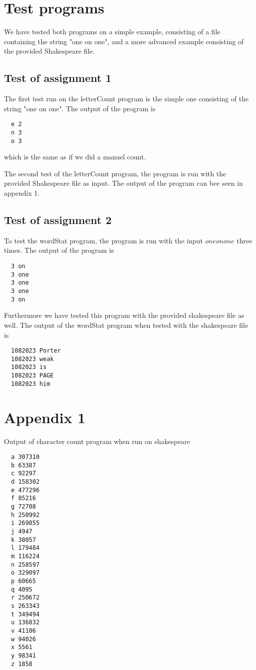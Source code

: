 \documentclass[10pt, a4paper]{article}
\begin{document}
               


\section{Test programs}
We have tested both programs on a simple example, consisting of a file containing the string "one on one", and a more advanced example consisting of the provided Shakespeare file.

\subsection{Test of assignment 1} %
\label{sub:assignment_1}
The first test run on the letterCount program is the simple one consisting of the string "one on one". The output of the program is
\begin{verbatim}
  e	2
  n	3
  o	3
\end{verbatim}
which is the same as if we did a manuel count.

The second test of the letterCount program, the program is run with the provided Shakespeare file as input. The output of the program can bee seen in appendix 1.

\subsection{Test of assignment 2} %
\label{sub:assignment_2}

To test the wordStat program, the program is run with the input $one on one$ three times. The output of the program is

\begin{verbatim}  
  3 on
  3 one
  3 one
  3 one    
  3 on  
\end{verbatim}

Furthermore we have tested this program with the provided shakespeare file as well. The output of the wordStat program when tested with the shakespeare file is

\begin{verbatim}
  1082023 Porter
  1082023 weak
  1082023 is
  1082023 PAGE
  1082023 him
\end{verbatim}


\newpage
\section*{Appendix 1} %
\label{sec:appendix_1}
Output of character count program when run on shakespeare
\begin{verbatim}
  a	307310
  b	63387
  c	92297
  d	158302
  e	477296
  f	85216
  g	72708
  h	250992
  i	269855
  j	4947
  k	38057
  l	179484
  m	116224
  n	258597
  o	329097
  p	60665
  q	4095
  r	250672
  s	263343
  t	349494
  u	136832
  v	41106
  w	94026
  x	5561
  y	98341
  z	1858
\end{verbatim}
\end{document}
